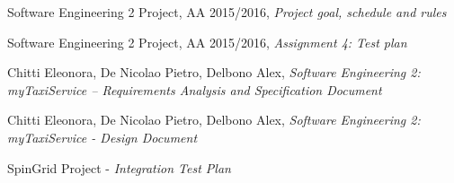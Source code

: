 \begin{thebibliography}{1}
        Software Engineering 2 Project, AA 2015/2016, \emph{Project goal, schedule and rules}

        Software Engineering 2 Project, AA 2015/2016, \emph{Assignment 4: Test plan}

        Chitti Eleonora, De Nicolao Pietro, Delbono Alex,
        \emph{Software Engineering 2: myTaxiService –
        Requirements Analysis and Specification Document}

        Chitti Eleonora, De Nicolao Pietro, Delbono Alex, \emph{Software Engineering 2: myTaxiService - Design Document}

        SpinGrid Project - \emph{Integration Test Plan}

\end{thebibliography}
